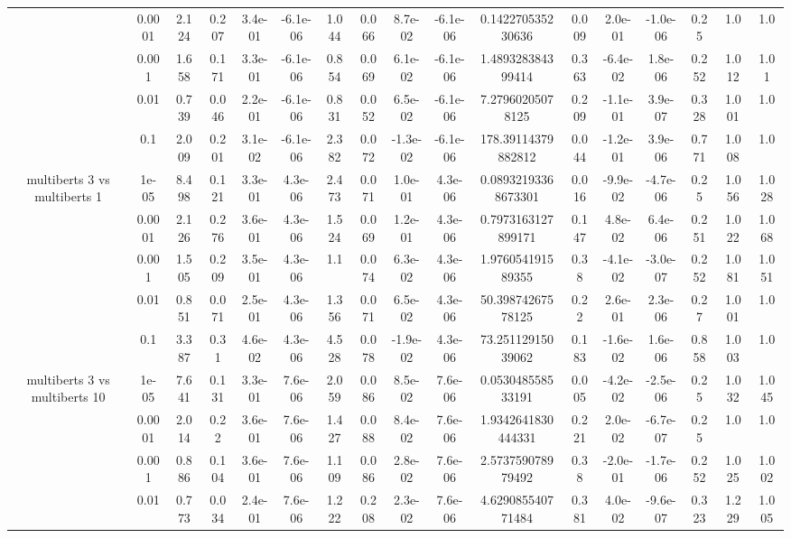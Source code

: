 \begin{tabular}{|c|c|c|c|c|c|c|c|c|c|c|c|c|c|c|c|c|}
 & 0.0001 & 2.124 & 0.207 & 3.4e-01 & -6.1e-06 & 1.044 & 0.066 & 8.7e-02 & -6.1e-06 & 0.142270535230636 & 0.009 & 2.0e-01 & -1.0e-06 & 0.25 & 1.0 & 1.0 \\
 & 0.001 & 1.658 & 0.171 & 3.3e-01 & -6.1e-06 & 0.854 & 0.069 & 6.1e-02 & -6.1e-06 & 1.489328384399414 & 0.363 & -6.4e-02 & 1.8e-06 & 0.252 & 1.012 & 1.01 \\
 & 0.01 & 0.739 & 0.046 & 2.2e-01 & -6.1e-06 & 0.831 & 0.052 & 6.5e-02 & -6.1e-06 & 7.27960205078125 & 0.209 & -1.1e-01 & 3.9e-07 & 0.328 & 1.001 & 1.0 \\
 & 0.1 & 2.009 & 0.201 & 3.1e-02 & -6.1e-06 & 2.382 & 0.072 & -1.3e-02 & -6.1e-06 & 178.39114379882812 & 0.044 & -1.2e-01 & 3.9e-06 & 0.771 & 1.008 & 1.0 \\
\hline
\multirow{5}{*}{multiberts 3 vs multiberts 1} & 1e-05 & 8.498 & 0.121 & 3.3e-01 & 4.3e-06 & 2.473 & 0.071 & 1.0e-01 & 4.3e-06 & 0.08932193368673301 & 0.016 & -9.9e-02 & -4.7e-06 & 0.25 & 1.056 & 1.028 \\
 & 0.0001 & 2.126 & 0.276 & 3.6e-01 & 4.3e-06 & 1.524 & 0.069 & 1.2e-01 & 4.3e-06 & 0.7973163127899171 & 0.147 & 4.8e-02 & 6.4e-06 & 0.251 & 1.022 & 1.068 \\
 & 0.001 & 1.505 & 0.209 & 3.5e-01 & 4.3e-06 & 1.1 & 0.074 & 6.3e-02 & 4.3e-06 & 1.976054191589355 & 0.38 & -4.1e-02 & -3.0e-07 & 0.252 & 1.081 & 1.051 \\
 & 0.01 & 0.851 & 0.071 & 2.5e-01 & 4.3e-06 & 1.356 & 0.071 & 6.5e-02 & 4.3e-06 & 50.39874267578125 & 0.22 & 2.6e-01 & 2.3e-06 & 0.27 & 1.001 & 1.0 \\
 & 0.1 & 3.387 & 0.31 & 4.6e-02 & 4.3e-06 & 4.528 & 0.078 & -1.9e-02 & 4.3e-06 & 73.25112915039062 & 0.183 & -1.6e-02 & 1.6e-06 & 0.858 & 1.003 & 1.0 \\
\hline
\multirow{5}{*}{multiberts 3 vs multiberts 10} & 1e-05 & 7.641 & 0.131 & 3.3e-01 & 7.6e-06 & 2.059 & 0.086 & 8.5e-02 & 7.6e-06 & 0.053048558533191 & 0.005 & -4.2e-02 & -2.5e-06 & 0.25 & 1.032 & 1.045 \\
 & 0.0001 & 2.014 & 0.22 & 3.6e-01 & 7.6e-06 & 1.427 & 0.088 & 8.4e-02 & 7.6e-06 & 1.9342641830444331 & 0.221 & 2.0e-02 & -6.7e-07 & 0.25 & 1.0 & 1.0 \\
 & 0.001 & 0.886 & 0.104 & 3.6e-01 & 7.6e-06 & 1.109 & 0.086 & 2.8e-02 & 7.6e-06 & 2.573759078979492 & 0.38 & -2.0e-01 & -1.7e-06 & 0.252 & 1.025 & 1.002 \\
 & 0.01 & 0.773 & 0.034 & 2.4e-01 & 7.6e-06 & 1.222 & 0.208 & 2.3e-02 & 7.6e-06 & 4.629085540771484 & 0.381 & 4.0e-02 & -9.6e-07 & 0.323 & 1.229 & 1.005 \\

\end{tabular}
